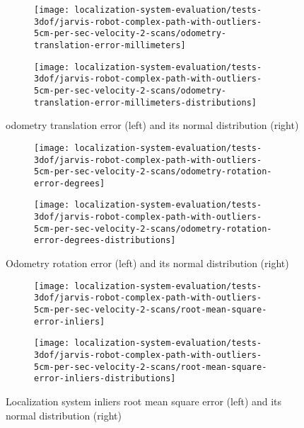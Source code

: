 \begin{figure}[ht]
	\centering
	\begin{subfigure}[h]{.497\textwidth}
		\centering
		\texttt{[image: localization-system-evaluation/tests-3dof/jarvis-robot-complex-path-with-outliers-5cm-per-sec-velocity-2-scans/odometry-translation-error-millimeters]}
	\end{subfigure}
	\begin{subfigure}[h]{.497\textwidth}
		\centering
		\texttt{[image: localization-system-evaluation/tests-3dof/jarvis-robot-complex-path-with-outliers-5cm-per-sec-velocity-2-scans/odometry-translation-error-millimeters-distributions]}
	\end{subfigure}
	\caption{odometry translation error (left) and its normal distribution (right)}
	\label{fig:localization-system-evaluation_jarvis-robot-complex-path-with-outliers-5cm-per-sec-velocity-2-scans_odometry-translation-errors}
\end{figure}

\begin{figure}[ht]
	\centering
	\begin{subfigure}[h]{.497\textwidth}
		\centering
		\texttt{[image: localization-system-evaluation/tests-3dof/jarvis-robot-complex-path-with-outliers-5cm-per-sec-velocity-2-scans/odometry-rotation-error-degrees]}
	\end{subfigure}
	\begin{subfigure}[h]{.497\textwidth}
		\centering
		\texttt{[image: localization-system-evaluation/tests-3dof/jarvis-robot-complex-path-with-outliers-5cm-per-sec-velocity-2-scans/odometry-rotation-error-degrees-distributions]}
	\end{subfigure}
	\caption{Odometry rotation error (left) and its normal distribution (right)}
	\label{fig:localization-system-evaluation_jarvis-robot-complex-path-with-outliers-5cm-per-sec-velocity-2-scans_odometry-rotation-errors}
\end{figure}

\begin{figure}[ht]
	\centering
	\begin{subfigure}[h]{.497\textwidth}
		\centering
		\texttt{[image: localization-system-evaluation/tests-3dof/jarvis-robot-complex-path-with-outliers-5cm-per-sec-velocity-2-scans/root-mean-square-error-inliers]}
	\end{subfigure}
	\begin{subfigure}[h]{.497\textwidth}
		\centering
		\texttt{[image: localization-system-evaluation/tests-3dof/jarvis-robot-complex-path-with-outliers-5cm-per-sec-velocity-2-scans/root-mean-square-error-inliers-distributions]}
	\end{subfigure}
	\caption{Localization system inliers root mean square error (left) and its normal distribution (right)}
	\label{fig:localization-system-evaluation_jarvis-robot-complex-path-with-outliers-5cm-per-sec-velocity-2-scans_inliers-rmse}
\end{figure}

